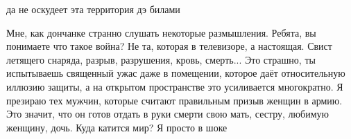  
 
 
 
 


да не оскудеет эта территория дэ билами


Мне, как дончанке странно слушать некоторые размышления.  Ребята, вы понимаете
что такое война? Не та, которая в телевизоре, а настоящая. Свист летящего
снаряда, разрыв, разрушения, кровь, смерть... Это страшно, ты испытываешь
священный  ужас даже  в помещении, которое даёт относительную иллюзию  защиты, а
на открытом пространстве это усиливается  многократно. Я презираю тех
мужчин, которые считают правильным  призыв женщин  в армию. Это значит, что он
готов отдать в руки смерти свою мать, сестру, любимую женщину, дочь. Куда катится
мир? Я просто в шоке 

